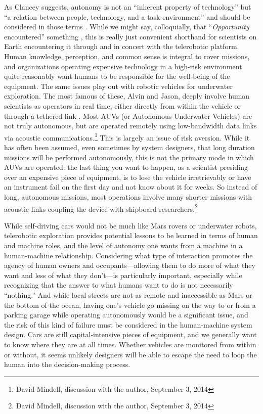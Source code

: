 As Clancey suggests, autonomy is not an ``inherent property of
technology'' but ``a relation between people, technology, and a
task-environment'' and should be considered in those terms \cite[p.
  119]{clancey}. While we might say, colloquially, that 
``\emph{Opportunity} encountered'' something \cite[p. 8]{clancey}, this
is really just convenient shorthand for scientists on Earth encountering it
through and in concert with the telerobotic platform. Human knowledge,
perception, and common sense is integral to rover missions, and
organizations operating expensive 
technology in a high-risk environment quite reasonably want humans to
be responsible
for the well-being of the equipment. The same issues play out with
robotic vehicles for underwater exploration. The most famous of these,
Alvin and Jason, deeply involve human scientists as operators in real
time, either directly from within the vehicle or through a tethered
link \cite{NOAA1} \cite{NOAA2}. Most AUVs (or Autonomous Underwater
Vehicles) are not 
truly autonomous, but are operated remotely using low-bandwidth data
links via acoustic communications.\footnote{David Mindell, discussion
  with the author, September 3, 2014} This is largely an issue of risk
aversion. While it has often been assumed, even sometimes by system
designers, that long duration missions will be performed autonomously,
this is not the primary mode in which AUVs are operated: the last
thing you want to happen, as a scientist presiding over an expensive
piece of equipment, is to lose the vehicle irretrievably or have an
instrument fail on the first day and not know about it for weeks. So
instead of long, autonomous missions, most operations involve many
shorter missions with acoustic links coupling the device with
shipboard researchers.\footnote{David Mindell, discussion with the
  author, September 3, 2014} 

While self-driving cars would not
be much like Mars rovers or underwater robots, telerobotic exploration
provides potential lessons
to be learned in terms of human and machine roles, and the level of
autonomy one wants from a machine in a human-machine relationship.
Considering what type of interaction promotes the agency
of human owners and occupants---allowing them to do more of what they
want and less of what they don't---is particularly important,
especially while recognizing that the answer to what humans want to do
is not necessarily ``nothing.'' And while local streets are not as
remote and inaccessible as Mars or the bottom of the ocean, having
one's vehicle go missing on the way to or from a parking garage while
operating autonomously would be a significant issue, and the risk of
this kind of failure must be considered in the human-machine system
design. Cars are still capital-intensive pieces of equipment, and we
generally want to know where they are at all times. Whether vehicles
are monitored
from within or without, it seems unlikely designers will be able to
escape the need to loop the human into the decision-making process.

